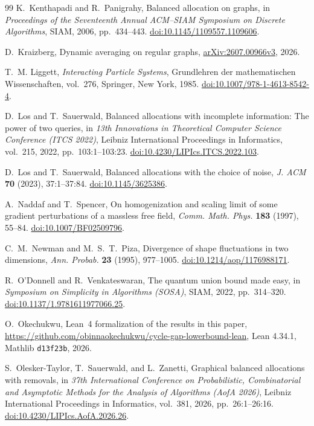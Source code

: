 \documentclass[11pt]{article}
\theoremstyle{remark}
\newcommand{\doi}[1]{\href{https://doi.org/#1}{doi:#1}}
\begin{document}
\begin{thebibliography}{99}
K.~Kenthapadi and R.~Panigrahy,
\newblock Balanced allocation on graphs,
\newblock in \emph{Proceedings of the Seventeenth Annual ACM--SIAM Symposium on Discrete Algorithms},
SIAM, 2006, pp.~434--443.
\newblock \doi{10.1145/1109557.1109606}.

D.~Kraizberg,
\newblock Dynamic averaging on regular graphs,
\newblock \href{https://arxiv.org/abs/2607.00966}{arXiv:2607.00966v3}, 2026.

T.~M. Liggett,
\newblock \emph{Interacting Particle Systems},
\newblock Grundlehren der mathematischen Wissenschaften, vol.~276, Springer, New York, 1985.
\newblock \doi{10.1007/978-1-4613-8542-4}.

D.~Los and T.~Sauerwald,
\newblock Balanced allocations with incomplete information: The power of two queries,
\newblock in \emph{13th Innovations in Theoretical Computer Science Conference (ITCS 2022)},
Leibniz International Proceedings in Informatics, vol.~215, 2022, pp.~103:1--103:23.
\newblock \doi{10.4230/LIPIcs.ITCS.2022.103}.

D.~Los and T.~Sauerwald,
\newblock Balanced allocations with the choice of noise,
\newblock \emph{J. ACM} \textbf{70} (2023), 37:1--37:84.
\newblock \doi{10.1145/3625386}.

A.~Naddaf and T.~Spencer,
\newblock On homogenization and scaling limit of some gradient perturbations of a massless free field,
\newblock \emph{Comm. Math. Phys.} \textbf{183} (1997), 55--84.
\newblock \doi{10.1007/BF02509796}.

C.~M.~Newman and M.~S.~T.~Piza,
\newblock Divergence of shape fluctuations in two dimensions,
\newblock \emph{Ann. Probab.} \textbf{23} (1995), 977--1005.
\newblock \doi{10.1214/aop/1176988171}.

R.~O'Donnell and R.~Venkateswaran,
\newblock The quantum union bound made easy,
\newblock in \emph{Symposium on Simplicity in Algorithms (SOSA)}, SIAM, 2022, pp.~314--320.
\newblock \doi{10.1137/1.9781611977066.25}.

O.~Okechukwu,
\newblock Lean~4 formalization of the results in this paper,
\newblock \url{https://github.com/obinnaokechukwu/cycle-gap-lowerbound-lean},
Lean 4.34.1, Mathlib \texttt{d13f23b}, 2026.

S.~Olesker-Taylor, T.~Sauerwald, and L.~Zanetti,
\newblock Graphical balanced allocations with removals,
\newblock in \emph{37th International Conference on Probabilistic, Combinatorial and Asymptotic Methods for the Analysis of Algorithms (AofA 2026)},
Leibniz International Proceedings in Informatics, vol.~381, 2026, pp.~26:1--26:16.
\newblock \doi{10.4230/LIPIcs.AofA.2026.26}.


\end{thebibliography}
\end{document}
